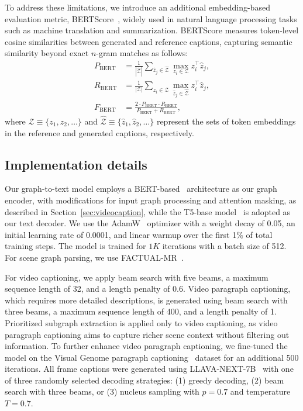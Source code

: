 To address these limitations, we introduce an additional embedding-based evaluation metric, BERTScore~\cite{zhang2019bertscore}, widely used in natural language processing tasks such as machine translation and summarization. 
BERTScore measures token-level cosine similarities between generated and reference captions, capturing semantic similarity beyond exact $n$-gram matches as follows: 
%
\begin{equation}
\begin{aligned}
	P_{\text{BERT}} &= \frac{1}{|\hat{\mathcal{Z}}|} \sum_{\hat{z}_j \in \hat{\mathcal{Z}}} \max_{z_i \in \mathcal{Z}} z_i^{\top} \hat{z}_j, \\
	R_{\text{BERT}} &= \frac{1}{|\mathcal{Z}|} \sum_{z_i \in \mathcal{Z}} \max_{\hat{z}_j \in \hat{\mathcal{Z}}} z_i^{\top} \hat{z}_j, \\
	F_{\text{BERT}} &= \frac{2 \cdot P_{\text{BERT}} \cdot R_{\text{BERT}}}{P_{\text{BERT}} + R_{\text{BERT}}},
\end{aligned}
\end{equation}
where $\mathcal{Z} \equiv \{ z_1, z_2, \dots\}$ and $\hat{\mathcal{Z}} \equiv \{ \hat{z}_1, \hat{z}_2, \dots\}$ represent the sets of token embeddings in the reference and generated captions, respectively. 
%

\subsection{Implementation details}
Our graph-to-text model employs a BERT-based~\cite{devlin2018bert} architecture as our graph encoder, with modifications for input graph processing and attention masking, as described in Section~\ref{sec:videocaption}, while the T5-base model~\cite{raffel2020exploring} is adopted as our text decoder.
We use the AdamW~\cite{loshchilov2017decoupled} optimizer with a weight decay of 0.05, an initial learning rate of 0.0001, and linear warmup over the first 1\% of total training steps. 
The model is trained for $1K$ iterations with a batch size of 512. 
For scene graph parsing, we use FACTUAL-MR~\cite{li-etal-2023-factual}.

For video captioning, we apply beam search with five beams, a maximum sequence length of 32, and a length penalty of 0.6. 
Video paragraph captioning, which requires more detailed descriptions, is generated using beam search with three beams, a maximum sequence length of 400, and a length penalty of 1. 
Prioritized subgraph extraction is applied only to video captioning, as video paragraph captioning aims to capture richer scene context without filtering out information.
To further enhance video paragraph captioning, we fine-tuned the model on the Visual Genome paragraph captioning~\cite{krause2016paragraphs} dataset for an additional 500 iterations. 
All frame captions were generated using LLAVA-NEXT-7B~\cite{liu2024llavanext} with one of three randomly selected decoding strategies: (1) greedy decoding, (2) beam search with three beams, or (3) nucleus sampling with $p = 0.7$ and temperature $T = 0.7$.



